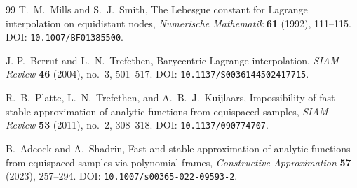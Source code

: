\documentclass[11pt,oneside]{article}
\theoremstyle{definition}
\theoremstyle{remark}
\begin{document}
\begin{thebibliography}{99}
T.~M.~Mills and S.~J.~Smith,
\newblock The Lebesgue constant for Lagrange interpolation on equidistant nodes,
\newblock \emph{Numerische Mathematik} \textbf{61} (1992), 111--115.
\newblock DOI: \nolinkurl{10.1007/BF01385500}.

J.-P.~Berrut and L.~N.~Trefethen,
\newblock Barycentric Lagrange interpolation,
\newblock \emph{SIAM Review} \textbf{46} (2004), no.~3, 501--517.
\newblock DOI: \nolinkurl{10.1137/S0036144502417715}.

R.~B.~Platte, L.~N.~Trefethen, and A.~B.~J.~Kuijlaars,
\newblock Impossibility of fast stable approximation of analytic functions from equispaced samples,
\newblock \emph{SIAM Review} \textbf{53} (2011), no.~2, 308--318.
\newblock DOI: \nolinkurl{10.1137/090774707}.

B.~Adcock and A.~Shadrin,
\newblock Fast and stable approximation of analytic functions from equispaced samples via polynomial frames,
\newblock \emph{Constructive Approximation} \textbf{57} (2023), 257--294.
\newblock DOI: \nolinkurl{10.1007/s00365-022-09593-2}.

\end{thebibliography}
\end{document}
